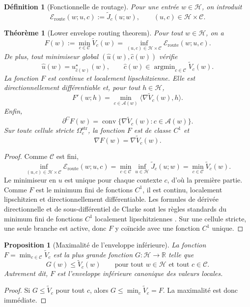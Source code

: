 \documentclass[11pt,a4paper]{article}
\newtheorem{definition}{Définition}[section]
\newtheorem{proposition}{Proposition}[section]
\newtheorem{theorem}{Théorème}[section]
\DeclareMathOperator{\argmin}{argmin}
\DeclareMathOperator{\conv}{conv}
\newcommand{\R}{\mathbb R}
\newcommand{\Hh}{\mathcal H}
\newcommand{\Ccal}{\mathcal C}
\newcommand{\Acal}{\mathcal A}
\begin{document}
\begin{definition}[Fonctionnelle de routage]
Pour une entrée \(w\in\Hh\), on introduit
\[
\mathcal E_{\mathrm{route}}(w;u,c):=\widetilde J_c(u;w),
\qquad (u,c)\in\Hh\times\Ccal.
\]
\end{definition}

\begin{theorem}[Lower envelope routing theorem]
Pour tout \(w\in\Hh\), on a
\[
F(w):=\min_{c\in\Ccal}\widetilde V_c(w)
=
\inf_{(u,c)\in\Hh\times\Ccal}\mathcal E_{\mathrm{route}}(w;u,c).
\]
De plus, tout minimiseur global \((\hat u(w),\hat c(w))\) vérifie
\[
\hat u(w)=u_{\hat c(w)}^\star(w),
\qquad
\hat c(w)\in\argmin_{c\in\Ccal}\widetilde V_c(w).
\]
La fonction \(F\) est continue et localement lipschitzienne. Elle est directionnellement différentiable et, pour tout \(h\in\Hh\),
\[
F'(w;h)=\min_{c\in\Acal(w)}\langle \nabla \widetilde V_c(w),h\rangle.
\]
Enfin,
\[
\partial^C F(w)=\conv\{\nabla \widetilde V_c(w): c\in\Acal(w)\}.
\]
Sur toute cellule stricte \(\Omega_c^{\mathrm{str}}\), la fonction \(F\) est de classe \(C^1\) et
\[
\nabla F(w)=\nabla \widetilde V_c(w).
\]
\end{theorem}

\begin{proof}
Comme \(\Ccal\) est fini,
\[
\inf_{(u,c)\in\Hh\times\Ccal}\mathcal E_{\mathrm{route}}(w;u,c)
=
\min_{c\in\Ccal}\inf_{u\in\Hh}\widetilde J_c(u;w)
=
\min_{c\in\Ccal}\widetilde V_c(w).
\]
Le minimiseur en \(u\) est unique pour chaque contexte \(c\), d'où la première partie. Comme \(F\) est le minimum fini de fonctions \(C^1\), il est continu, localement lipschitzien et directionnellement différentiable. Les formules de dérivée directionnelle et de sous-différentiel de Clarke sont les règles standards du minimum fini de fonctions \(C^1\) localement lipschitziennes \cite{Clarke1983}. Sur une cellule stricte, une seule branche est active, donc \(F\) y coïncide avec une fonction \(C^1\) unique.
\end{proof}

\begin{proposition}[Maximalité de l'enveloppe inférieure]
La fonction \(F=\min_{c\in\Ccal}\widetilde V_c\) est la plus grande fonction \(G:\Hh\to\R\) telle que
\[
G(w)\le \widetilde V_c(w)\qquad\text{pour tout }w\in\Hh\text{ et tout }c\in\Ccal.
\]
Autrement dit, \(F\) est l'enveloppe inférieure canonique des valeurs locales.
\end{proposition}

\begin{proof}
Si \(G\le \widetilde V_c\) pour tout \(c\), alors \(G\le \min_c \widetilde V_c=F\). La maximalité est donc immédiate.
\end{proof}
\end{document}

